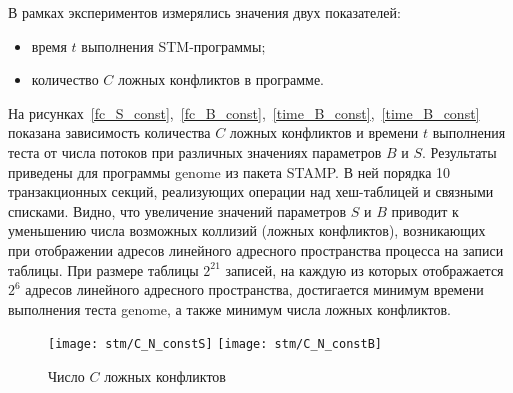 В рамках экспериментов измерялись значения двух показателей:
\begin{itemize}
\item время $t$ выполнения STM-программы;
\item количество $C$ ложных конфликтов в программе.
\end{itemize}

На рисунках~\ref{fc_S_const},~\ref{fc_B_const},~\ref{time_B_const},~\ref{time_B_const} показана зависимость количества $C$ ложных конфликтов и времени $t$ выполнения теста от числа потоков при различных значениях параметров $B$ и $S$. Результаты приведены для программы genome из пакета STAMP. В ней порядка 10 транзакционных секций, реализующих операции над хеш-таблицей и связными списками. Видно, что увеличение значений параметров $S$ и $B$ приводит к уменьшению числа возможных коллизий (ложных конфликтов), возникающих при отображении адресов линейного адресного пространства процесса на записи таблицы. При размере таблицы $2^{21}$ записей, на каждую из которых отображается $2^{6}$ адресов линейного адресного пространства, достигается минимум времени выполнения теста genome, а также минимум числа ложных конфликтов. 


\begin{figure}
    \centering
	{\texttt{[image: stm/C\_N\_constS]}}%
	{\texttt{[image: stm/C\_N\_constB]}}
    \caption{Число $C$ ложных конфликтов}
    \label{graph:C_N}
\end{figure}


\begin{figure}[ht]
\end{figure}

\begin{figure}[ht]
\end{figure}

